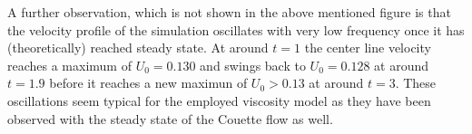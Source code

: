 \documentclass{report}
\begin{document}
A further observation, which is not shown in the above mentioned figure is that the velocity profile of the simulation oscillates with very low frequency once it has (theoretically) reached steady state. At around $t=1$ the center line velocity reaches a maximum of $U_0=0.130$ and swings back to $U_0=0.128$ at around $t=1.9$ before it reaches a new maximun of $U_0>0.13$ at around $t=3$. These oscillations seem typical for the employed viscosity model as they have been observed with the steady state of the Couette flow as well.  


\end{document}
